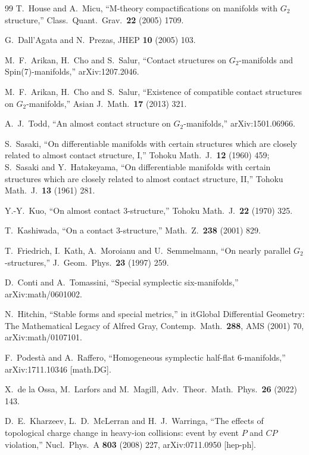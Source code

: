 \documentclass[a4paper,11pt,fleqn]{article}
\theoremstyle{plain}
\theoremstyle{definition}
\begin{document}
\begin{thebibliography}{99}
T.~House and A.~Micu,
``M-theory compactifications on manifolds with $G_2$ structure,''
Class.\ Quant.\ Grav.\ {\bf 22} (2005) 1709.

G.~Dall'Agata and N.~Prezas,
JHEP {\bf 10} (2005) 103.

M.~F.~Arikan, H.~Cho and S.~Salur,
``Contact structures on $G_2$-manifolds and Spin(7)-manifolds,''
arXiv:1207.2046.

M.~F.~Arikan, H.~Cho and S.~Salur,
``Existence of compatible contact structures on $G_2$-manifolds,''
Asian J.\ Math.\ {\bf 17} (2013) 321.

A.~J.~Todd,
``An almost contact structure on $G_2$-manifolds,''
arXiv:1501.06966.

S.~Sasaki,
``On differentiable manifolds with certain structures which are closely related to almost contact structure, I,''
Tohoku Math.\ J.\ {\bf 12} (1960) 459;
S.~Sasaki and Y.~Hatakeyama,
``On differentiable manifolds with certain structures which are closely related to almost contact structure, II,''
Tohoku Math.\ J.\ {\bf 13} (1961) 281.

Y.-Y.~Kuo,
``On almost contact 3-structure,''
Tohoku Math.\ J.\ {\bf 22} (1970) 325.

T.~Kashiwada,
``On a contact 3-structure,''
Math.\ Z.\ {\bf 238} (2001) 829.

T.~Friedrich, I.~Kath, A.~Moroianu and U.~Semmelmann,
``On nearly parallel $G_2$-structures,''
J.\ Geom.\ Phys.\ {\bf 23} (1997) 259.

D.~Conti and A.~Tomassini,
``Special symplectic six-manifolds,''
arXiv:math/0601002.

N.~Hitchin,
``Stable forms and special metrics,''
in it{Global Differential Geometry: The Mathematical Legacy of Alfred Gray},
Contemp.\ Math.\ {\bf 288}, AMS (2001) 70,
arXiv:math/0107101.

F.~Podest\`{a} and A.~Raffero,
``Homogeneous symplectic half-flat 6-manifolds,''
arXiv:1711.10346 [math.DG].

X.~de la Ossa, M.~Larfors and M.~Magill,
Adv.\ Theor.\ Math.\ Phys.\ {\bf 26} (2022) 143.

 D.~E.~Kharzeev, L.~D.~McLerran and H.~J.~Warringa,
``The effects of topological charge change in heavy-ion collisions: event by event $P$ and $CP$ violation,'' Nucl.\ Phys.\ A {\bf 803} (2008) 227,
arXiv:0711.0950 [hep-ph].


\end{thebibliography}
\end{document}
